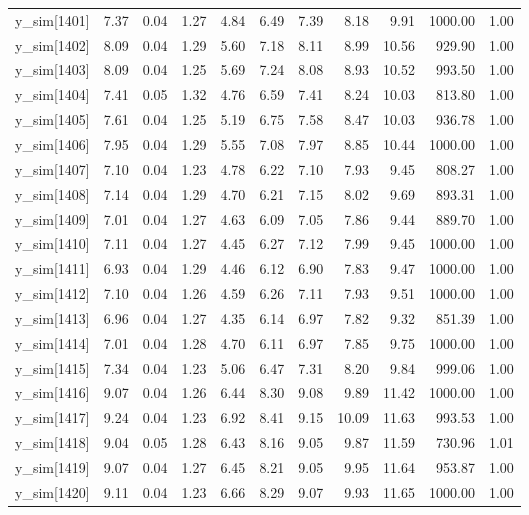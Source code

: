 \begin{table}[ht]
\begin{tabular}{rrrrrrrrrrr}
  y\_sim[1401] & 7.37 & 0.04 & 1.27 & 4.84 & 6.49 & 7.39 & 8.18 & 9.91 & 1000.00 & 1.00 \\ 
  y\_sim[1402] & 8.09 & 0.04 & 1.29 & 5.60 & 7.18 & 8.11 & 8.99 & 10.56 & 929.90 & 1.00 \\ 
  y\_sim[1403] & 8.09 & 0.04 & 1.25 & 5.69 & 7.24 & 8.08 & 8.93 & 10.52 & 993.50 & 1.00 \\ 
  y\_sim[1404] & 7.41 & 0.05 & 1.32 & 4.76 & 6.59 & 7.41 & 8.24 & 10.03 & 813.80 & 1.00 \\ 
  y\_sim[1405] & 7.61 & 0.04 & 1.25 & 5.19 & 6.75 & 7.58 & 8.47 & 10.03 & 936.78 & 1.00 \\ 
  y\_sim[1406] & 7.95 & 0.04 & 1.29 & 5.55 & 7.08 & 7.97 & 8.85 & 10.44 & 1000.00 & 1.00 \\ 
  y\_sim[1407] & 7.10 & 0.04 & 1.23 & 4.78 & 6.22 & 7.10 & 7.93 & 9.45 & 808.27 & 1.00 \\ 
  y\_sim[1408] & 7.14 & 0.04 & 1.29 & 4.70 & 6.21 & 7.15 & 8.02 & 9.69 & 893.31 & 1.00 \\ 
  y\_sim[1409] & 7.01 & 0.04 & 1.27 & 4.63 & 6.09 & 7.05 & 7.86 & 9.44 & 889.70 & 1.00 \\ 
  y\_sim[1410] & 7.11 & 0.04 & 1.27 & 4.45 & 6.27 & 7.12 & 7.99 & 9.45 & 1000.00 & 1.00 \\ 
  y\_sim[1411] & 6.93 & 0.04 & 1.29 & 4.46 & 6.12 & 6.90 & 7.83 & 9.47 & 1000.00 & 1.00 \\ 
  y\_sim[1412] & 7.10 & 0.04 & 1.26 & 4.59 & 6.26 & 7.11 & 7.93 & 9.51 & 1000.00 & 1.00 \\ 
  y\_sim[1413] & 6.96 & 0.04 & 1.27 & 4.35 & 6.14 & 6.97 & 7.82 & 9.32 & 851.39 & 1.00 \\ 
  y\_sim[1414] & 7.01 & 0.04 & 1.28 & 4.70 & 6.11 & 6.97 & 7.85 & 9.75 & 1000.00 & 1.00 \\ 
  y\_sim[1415] & 7.34 & 0.04 & 1.23 & 5.06 & 6.47 & 7.31 & 8.20 & 9.84 & 999.06 & 1.00 \\ 
  y\_sim[1416] & 9.07 & 0.04 & 1.26 & 6.44 & 8.30 & 9.08 & 9.89 & 11.42 & 1000.00 & 1.00 \\ 
  y\_sim[1417] & 9.24 & 0.04 & 1.23 & 6.92 & 8.41 & 9.15 & 10.09 & 11.63 & 993.53 & 1.00 \\ 
  y\_sim[1418] & 9.04 & 0.05 & 1.28 & 6.43 & 8.16 & 9.05 & 9.87 & 11.59 & 730.96 & 1.01 \\ 
  y\_sim[1419] & 9.07 & 0.04 & 1.27 & 6.45 & 8.21 & 9.05 & 9.95 & 11.64 & 953.87 & 1.00 \\ 
  y\_sim[1420] & 9.11 & 0.04 & 1.23 & 6.66 & 8.29 & 9.07 & 9.93 & 11.65 & 1000.00 & 1.00 \\ 

\end{tabular}
\end{table}
